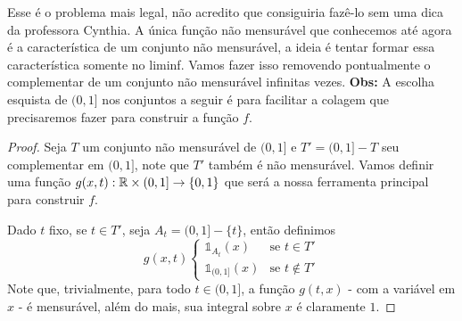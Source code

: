 \begin{problem}
    \label{prob:l3:6}
\end{problem}
Esse é o problema mais legal, não acredito que consiguiria fazê-lo sem uma dica da professora Cynthia.
A única função não mensurável que conhecemos até agora é a característica de um conjunto não mensurável,
a ideia é tentar formar essa característica somente no liminf. Vamos fazer isso removendo pontualmente 
o complementar de um conjunto não mensurável infinitas vezes. \textbf{Obs:} A escolha esquista
de $(0,1]$ nos conjuntos a seguir é para facilitar a colagem que precisaremos fazer para construir a função $f$.
\begin{proof}
    Seja $T$ um conjunto não mensurável de $(0,1]$ e $T' = (0,1] - T$ seu complementar em $(0,1]$, note que $T'$ também é não mensurável.
    Vamos definir uma função $g(x,t) : \mathbb{R}\times(0,1] \rightarrow \{0,1\}$ que será a nossa ferramenta principal para construir  $f$.
    
    Dado $t$ fixo, se $t \in T'$, seja $A_t = (0,1] - \{t\}$, então definimos 
    $$g(x,t) \begin{cases}
        \mathds{1}_{A_t}(x) & \text{se } t \in T'\\
        \mathds{1}_{(0,1]}(x) & \text{se } t \not \in T'
    \end{cases}$$
    Note que, trivialmente, para todo $t \in (0,1]$, a função $g(t,x)$ -
    com a variável em $x$ - é mensurável, além do mais, sua integral sobre $x$ é claramente $1$. 
    

\end{proof}
